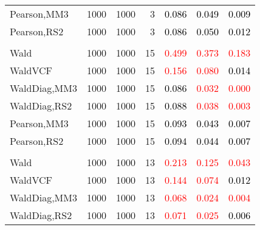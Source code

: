 \documentclass[
]{article}
\begin{document}
\begin{table}[H]
{\begin{tabular}[t]{lrrrrrr}
\hspace{1em}Pearson,MM3 & 1000 & 1000 & 3 & \textcolor{black}{0.086} & \textcolor{black}{0.049} & \textcolor{black}{0.009}\\
\hspace{1em}Pearson,RS2 & 1000 & 1000 & 3 & \textcolor{black}{0.086} & \textcolor{black}{0.050} & \textcolor{black}{0.012}\\
\addlinespace[0.3em]
\multicolumn{7}{l}{\textbf{1F 15V}}\\
\hspace{1em}Wald & 1000 & 1000 & 15 & \textcolor{red}{0.499} & \textcolor{red}{0.373} & \textcolor{red}{0.183}\\
\hspace{1em}WaldVCF & 1000 & 1000 & 15 & \textcolor{red}{0.156} & \textcolor{red}{0.080} & \textcolor{black}{0.014}\\
\hspace{1em}WaldDiag,MM3 & 1000 & 1000 & 15 & \textcolor{black}{0.086} & \textcolor{red}{0.032} & \textcolor{red}{0.000}\\
\hspace{1em}WaldDiag,RS2 & 1000 & 1000 & 15 & \textcolor{black}{0.088} & \textcolor{red}{0.038} & \textcolor{red}{0.003}\\
\hspace{1em}Pearson,MM3 & 1000 & 1000 & 15 & \textcolor{black}{0.093} & \textcolor{black}{0.043} & \textcolor{black}{0.007}\\
\hspace{1em}Pearson,RS2 & 1000 & 1000 & 15 & \textcolor{black}{0.094} & \textcolor{black}{0.044} & \textcolor{black}{0.007}\\
\addlinespace[0.3em]
\multicolumn{7}{l}{\textbf{2F 10V}}\\
\hspace{1em}Wald & 1000 & 1000 & 13 & \textcolor{red}{0.213} & \textcolor{red}{0.125} & \textcolor{red}{0.043}\\
\hspace{1em}WaldVCF & 1000 & 1000 & 13 & \textcolor{red}{0.144} & \textcolor{red}{0.074} & \textcolor{black}{0.012}\\
\hspace{1em}WaldDiag,MM3 & 1000 & 1000 & 13 & \textcolor{red}{0.068} & \textcolor{red}{0.024} & \textcolor{red}{0.004}\\
\hspace{1em}WaldDiag,RS2 & 1000 & 1000 & 13 & \textcolor{red}{0.071} & \textcolor{red}{0.025} & \textcolor{black}{0.006}\\

\end{tabular}}
\end{table}
\end{document}
